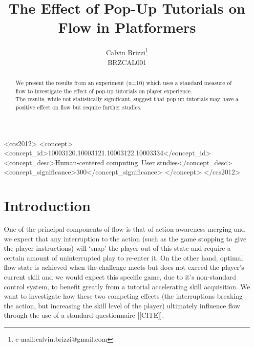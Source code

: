 \documentclass{acmsiggraph}
\title{The Effect of Pop-Up Tutorials on Flow in Platformers}
\author{Calvin Brizzi\thanks{e-mail:calvin.brizzi@gmail.com}\\BRZCAL001}
\begin{document}


\maketitle

\begin{abstract}

We present the results from an experiment (n=10) which uses a standard measure of flow to investigate the effect of pop-up tutorials on player experience.\\
The results, while not statistically significant, suggest that pop-up tutorials may have a positive effect on flow but require further studies.

\end{abstract}

%
%
\begin{CCSXML}
<ccs2012>
<concept>
<concept_id>10003120.10003121.10003122.10003334</concept_id>
<concept_desc>Human-centered computing~User studies</concept_desc>
<concept_significance>300</concept_significance>
</concept>
</ccs2012>
\end{CCSXML}


%
%


\keywordlist

\conceptlist

\printcopyright

\section{Introduction}
One of the principal components of flow is that of action-awareness merging \cite{jackson} and we expect that any interruption to the action (such as the game stopping to give the player instructions) will ‘snap’ the player out of this state and require a certain amount of uninterrupted play to re-enter it.
On the other hand, optimal flow state is achieved when the challenge meets but does not exceed the player’s current skill \cite{nakamura} and we would expect this specific game, due to it’s non-standard control system, to benefit greatly from a tutorial \cite{andersen} accelerating skill acquisition. 
We want to investigate how these two competing effects (the interruptions breaking the action, but increasing the skill level of the player) ultimately influence flow through the use of a standard questionnaire [[CITE]].
\end{document}
